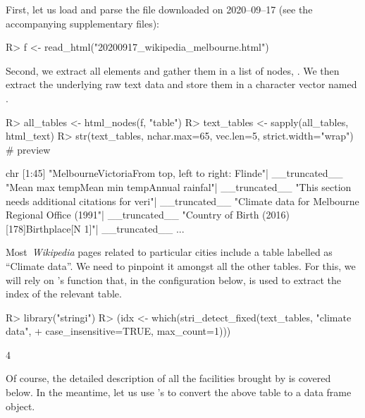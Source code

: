 \documentclass[nojss]{jss}
\begin{document}
First, let us load and parse the  file
downloaded on 2020--09--17 (see the accompanying supplementary files):

\begin{Schunk}
\begin{Sinput}
R> f <- read_html("20200917_wikipedia_melbourne.html")
\end{Sinput}
\end{Schunk}

Second, we extract all  elements and gather them
in a list of  nodes, .
We then extract the underlying raw text data and store them in a
character vector named .

\begin{Schunk}
\begin{Sinput}
R> all_tables <- html_nodes(f, "table")
R> text_tables <- sapply(all_tables, html_text)
R> str(text_tables, nchar.max=65, vec.len=5, strict.width="wrap") # preview
\end{Sinput}
\begin{Soutput}
chr [1:45] "MelbourneVictoriaFrom top, left to right: Flinde"| __truncated__
   "Mean max temp\n Mean min temp\n Annual rainfal"| __truncated__ "This
   section needs additional citations for veri"| __truncated__ "Climate data
   for Melbourne Regional Office (1991"| __truncated__ "Country of Birth
   (2016)[178]Birthplace[N 1]\nPop"| __truncated__ ...
\end{Soutput}
\end{Schunk}

Most~\textit{Wikipedia} pages related to particular cities
include a table labelled as ``Climate data''.
We need to pinpoint it amongst all the other tables.
For this, we will rely on 's
 function that, in the configuration
below, is used to extract the index of the relevant table.

\begin{Schunk}
\begin{Sinput}
R> library("stringi")
R> (idx <- which(stri_detect_fixed(text_tables, "climate data",
+    case_insensitive=TRUE, max_count=1)))
\end{Sinput}
\begin{Soutput}
[1] 4
\end{Soutput}
\end{Schunk}

Of course, the detailed description of all the facilities
brought by  is covered below.
In the meantime, let us use 's 
to convert the above table to a data frame object.
\end{document}
